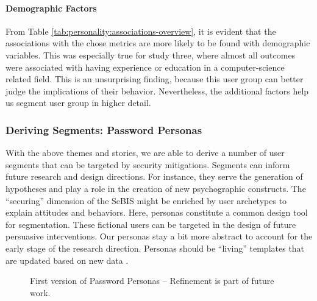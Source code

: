 \paragraph{Demographic Factors}
From Table \ref{tab:personality:associations-overview}, it is evident that the associations with the chose metrics are more likely to be found with demographic variables. This was especially true for study three, where almost all outcomes were associated with having experience or education in a computer-science related field. This is an unsurprising finding, because this user group can better judge the implications of their behavior. Nevertheless, the additional factors help us segment user group in higher detail. 

\subsubsection{Deriving Segments: Password Personas}
With the above themes and stories, we are able to derive a number of user segments that can be targeted by security mitigations. Segments can inform future research and design directions. For instance, they serve the generation of hypotheses and play a role in the creation of new psychographic constructs. The ``securing'' dimension of the \gls{SeBIS} might be enriched by user archetypes to explain attitudes and behaviors. Here, \glspl{persona} constitute a common design tool for segmentation. These fictional users can be targeted in the design of future persuasive interventions. Our personas stay a bit more abstract to account for the early stage of the research direction. Personas should be ``living'' templates that are updated based on new data \cite{Gothelf2013LeanUX}. 

\begin{figure}
	\centering
	\caption{\label{fig:personality:personas} First version of Password Personas -- Refinement is part of future work.}
\end{figure}

